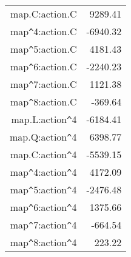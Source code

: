\documentclass[10pt,a4paper]{article}
\begin{document}
\begin{table}[ht]
\begin{tabular}{rr}
  map.C:action.C & 9289.41 \\ 
  map\verb|^|4:action.C & -6940.32 \\ 
  map\verb|^|5:action.C & 4181.43 \\ 
  map\verb|^|6:action.C & -2240.23 \\ 
  map\verb|^|7:action.C & 1121.38 \\ 
  map\verb|^|8:action.C & -369.64 \\ 
  map.L:action\verb|^|4 & -6184.41 \\ 
  map.Q:action\verb|^|4 & 6398.77 \\ 
  map.C:action\verb|^|4 & -5539.15 \\ 
  map\verb|^|4:action\verb|^|4 & 4172.09 \\ 
  map\verb|^|5:action\verb|^|4 & -2476.48 \\ 
  map\verb|^|6:action\verb|^|4 & 1375.66 \\ 
  map\verb|^|7:action\verb|^|4 & -664.54 \\ 
  map\verb|^|8:action\verb|^|4 & 223.22 \\ 
   \hline
\end{tabular}
\end{table}
\end{document}
